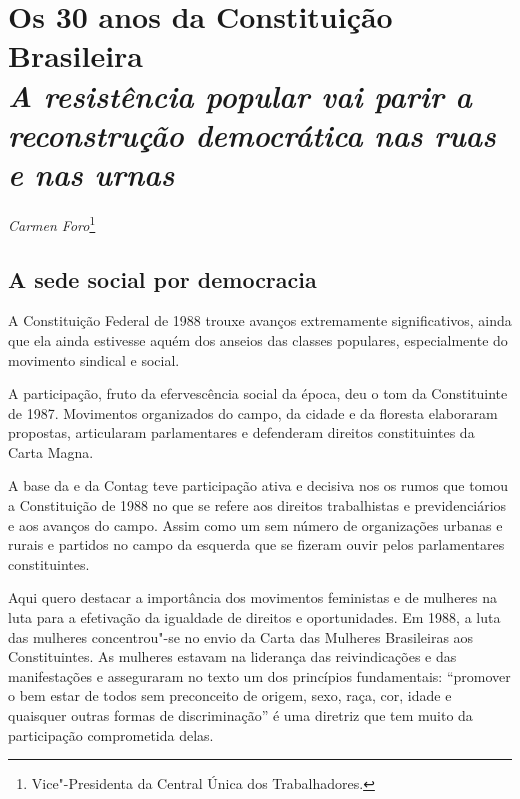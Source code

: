 \chapter*{Os 30 anos da Constituição Brasileira\\
\emph{A resistência popular vai parir a reconstrução democrática nas
ruas e nas urnas}}


\begin{flushright}
\emph{Carmen Foro}\footnote{Vice"-Presidenta da Central Única dos Trabalhadores.}
\end{flushright}

\section{A sede social por democracia}

A Constituição Federal de 1988 trouxe avanços extremamente
significativos, ainda que ela ainda estivesse aquém dos anseios das
classes populares, especialmente do movimento sindical e social.

A participação, fruto da efervescência social da época, deu o tom da
Constituinte de 1987. Movimentos organizados do campo, da cidade e da
floresta elaboraram propostas, articularam parlamentares e defenderam
direitos constituintes da Carta Magna.

A base da  e da Contag teve participação ativa e decisiva nos os
rumos que tomou a Constituição de 1988 no que se refere aos direitos
trabalhistas e previdenciários e aos avanços do campo. Assim como um sem
número de organizações urbanas e rurais e partidos no campo da esquerda
que se fizeram ouvir pelos parlamentares constituintes.

Aqui quero destacar a importância dos movimentos feministas e de
mulheres na luta para a efetivação da igualdade de direitos e
oportunidades. Em 1988, a luta das mulheres concentrou"-se no
envio da Carta das Mulheres Brasileiras aos
Constituintes. As mulheres estavam na liderança das reivindicações e das
manifestações e asseguraram no texto um dos princípios fundamentais:
``promover o bem estar de todos sem preconceito de origem, sexo, raça,
cor, idade e quaisquer outras formas de discriminação'' é uma diretriz
que tem muito da participação comprometida delas.

